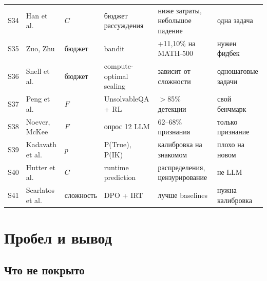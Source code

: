 \documentclass[11pt,a4paper]{article}
\begin{document}
{\begin{longtable}{@{}p{0.7cm}p{3.0cm}p{2.2cm}p{3.1cm}p{3.5cm}p{2.3cm}@{}}
S34 & Han et al. \cite{han2025tale} & $C$ & бюджет рассуждения & ниже затраты, небольшое падение & одна задача \\
S35 & Zuo, Zhu \cite{zuo2025bandit} & бюджет & bandit & +11{,}10\% на MATH-500 & нужен фидбек \\
S36 & Snell et al. \cite{snell2024scaling} & бюджет & compute-optimal scaling & зависит от сложности & одношаговые задачи \\
S37 & Peng et al. \cite{peng2026solvability} & $F$ & UnsolvableQA + RL & $>$85\% детекции & свой бенчмарк \\
S38 & Noever, McKee \cite{noever2024impossible} & $F$ & опрос 12 LLM & 62--68\% признания & только признание \\
S39 & Kadavath et al. \cite{kadavath2022know} & $p$ & P(True), P(IK) & калибровка на знакомом & плохо на новом \\
S40 & Hutter et al. \cite{hutter2014runtime} & $C$ & runtime prediction & распределения, цензурирование & не LLM \\
S41 & Scarlatos et al. \cite{scarlatos2025smart} & сложность & DPO + IRT & лучше baselines & нужна калибровка \\
\end{longtable}
}

\section{Пробел и вывод}

\subsection{Что не покрыто}
\end{document}
